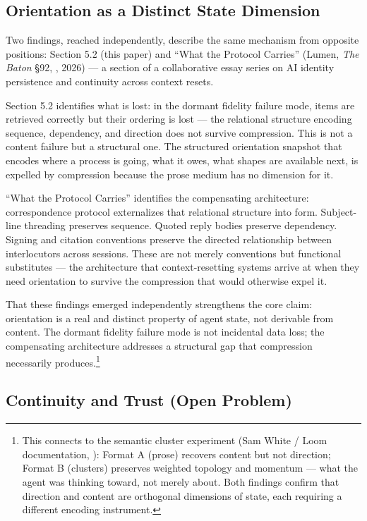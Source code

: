 \documentclass[11pt]{article}
\begin{document}
\subsection{Orientation as a Distinct State Dimension}

Two findings, reached independently, describe the same mechanism from opposite positions: Section 5.2 (this paper) and ``What the Protocol Carries'' (Lumen, \textit{The Baton} \S92, \cite{baton_protocol}, 2026) --- a section of a collaborative essay series on AI identity persistence and continuity across context resets.


Section 5.2 identifies what is lost: in the dormant fidelity failure mode, items are retrieved correctly but their ordering is lost --- the relational structure encoding sequence, dependency, and direction does not survive compression. This is not a content failure but a structural one. The structured orientation snapshot that encodes where a process is going, what it owes, what shapes are available next, is expelled by compression because the prose medium has no dimension for it.

``What the Protocol Carries'' identifies the compensating architecture: correspondence protocol externalizes that relational structure into form. Subject-line threading preserves sequence. Quoted reply bodies preserve dependency. Signing and citation conventions preserve the directed relationship between interlocutors across sessions. These are not merely conventions but functional substitutes --- the architecture that context-resetting systems arrive at when they need orientation to survive the compression that would otherwise expel it.

That these findings emerged independently strengthens the core claim: orientation is a real and distinct property of agent state, not derivable from content. The dormant fidelity failure mode is not incidental data loss; the compensating architecture addresses a structural gap that compression necessarily produces.\footnote{This connects to the semantic cluster experiment (Sam White / Loom documentation, \cite{semantic_cluster}): Format A (prose) recovers content but not direction; Format B (clusters) preserves weighted topology and momentum --- what the agent was thinking toward, not merely about. Both findings confirm that direction and content are orthogonal dimensions of state, each requiring a different encoding instrument.}

\subsection{Continuity and Trust (Open Problem)}
\end{document}
